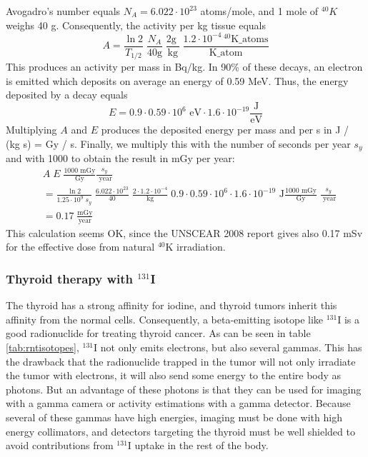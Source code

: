 \documentclass[11pt,oneside]{article}
\begin{document}
Avogadro's number equals $N_A = 6.022 \cdot 10^{23}$ atoms/mole, and 1 mole
of $^{40}K$ weighs 40 g. Consequently, the activity per kg tissue equals
\begin{equation}
  A = \frac{\ln 2}{T_{1/2}} \;
  \frac{N_A}{40 \mathrm{g}} \;
  \frac{2 \mathrm{g} \;}{\mathrm{kg}} \;
  \frac{1.2 \cdot 10^{-4} \,
    ^{40}\mathrm{K\_atoms}}{\mathrm{K\_atom}}
\end{equation}
This produces an activity per mass in Bq/kg.  In 90\% of these decays,
an electron is emitted which deposits on average an energy of 0.59
MeV. Thus, the energy deposited by a decay equals
\begin{equation}
  E = 0.9 \cdot 0.59 \cdot 10^6 \mbox{ eV} \cdot 1.6
    \cdot 10^{-19} \frac{\mbox{J}}{\mbox{eV}}
\end{equation}
Multiplying $A$ and $E$ produces the deposited energy per mass and per
s in J / (kg s) = Gy / s. Finally, we multiply this with the number of
seconds per year $s_y$ and with 1000 to obtain the result in mGy per
year:
\begin{align}
  &A\;E \; \frac{\mbox{1000 mGy}}{\mbox{Gy}} \frac{s_y}{\mbox{ year}}\\
  &= \frac{\ln 2}{1.25 \cdot 10^9 \; s_y} \;
  \frac{6.022 \cdot 10^{23}}{40} \;
  \frac{2 \cdot 1.2 \cdot 10^{-4}}{\mbox{kg}} \;
  0.9 \cdot 0.59 \cdot 10^6 \cdot 1.6 \cdot 10^{-19} \mbox{ J}
   \frac{\mbox{1000 mGy}}{\mbox{Gy}} \; \frac{s_y}{\mbox{ year}} \nonumber\\
  &= 0.17 \;\frac{\mbox{mGy}}{\mbox{year}}
\end{align}
This calculation seems OK, since the UNSCEAR 2008 report gives also
0.17 mSv for the effective dose from natural $^{40}$K irradiation.

\subsubsection{Thyroid therapy with $^{131}$I}
The thyroid has a strong affinity for iodine, and thyroid tumors
inherit this affinity from the normal cells. Consequently, a
beta-emitting isotope like $^{131}$I is a good radionuclide for
treating thyroid cancer. As can be seen in table
\ref{tab:rntisotopes}, $^{131}$I not only emits electrons, but also
several gammas. This has the drawback that the radionuclide trapped in
the tumor will not only irradiate the tumor with electrons, it will
also send some energy to the entire body as photons. But an advantage
of these photons is that they can be used for imaging with a gamma
camera or activity estimations with a gamma detector. Because several
of these gammas have high energies, imaging must be done with high
energy collimators, and detectors targeting the thyroid must be well
shielded to avoid contributions from $^{131}$I uptake in the rest of
the body.
\end{document}
